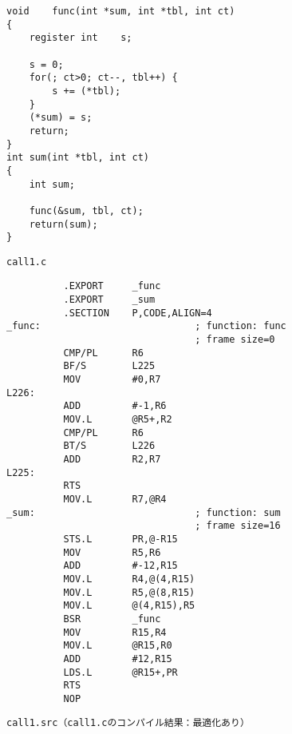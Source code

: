 \documentclass[a4j,10pt,fleqn]{jsarticle}
\begin{document}
\begin{figure}[tpb]
\begin{boxnote}
{\small\begin{verbatim}
void    func(int *sum, int *tbl, int ct)
{
    register int    s;

    s = 0;
    for(; ct>0; ct--, tbl++) {
        s += (*tbl);
    }
    (*sum) = s;
    return;
}
int sum(int *tbl, int ct)
{
    int sum;

    func(&sum, tbl, ct);
    return(sum);
}
\end{verbatim}}
\end{boxnote}
\caption{\texttt{call1.c}} \label{fig:call1.c}
\end{figure}
\begin{figure}[tpb]
\begin{boxnote}
{\small\begin{verbatim}
          .EXPORT     _func
          .EXPORT     _sum
          .SECTION    P,CODE,ALIGN=4
_func:                           ; function: func
                                 ; frame size=0
          CMP/PL      R6
          BF/S        L225
          MOV         #0,R7
L226:
          ADD         #-1,R6
          MOV.L       @R5+,R2
          CMP/PL      R6
          BT/S        L226
          ADD         R2,R7
L225:
          RTS
          MOV.L       R7,@R4
_sum:                            ; function: sum
                                 ; frame size=16
          STS.L       PR,@-R15
          MOV         R5,R6
          ADD         #-12,R15
          MOV.L       R4,@(4,R15)
          MOV.L       R5,@(8,R15)
          MOV.L       @(4,R15),R5
          BSR         _func
          MOV         R15,R4
          MOV.L       @R15,R0
          ADD         #12,R15
          LDS.L       @R15+,PR
          RTS
          NOP
\end{verbatim}}
\end{boxnote}
\caption{\texttt{call1.src（call1.cのコンパイル結果：最適化あり）}} \label{fig:call1.src}
\end{figure}
\end{document}
